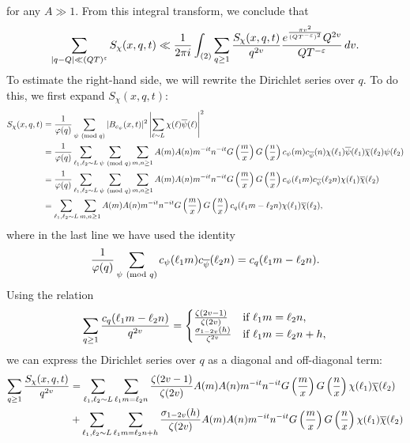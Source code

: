 \documentclass[12pt,reqno,oneside]{amsart}
\begin{document}
    for any $A \gg 1$. From this integral transform, we conclude that
    \[
      \sum_{|q-Q| \ll (QT)^{\varepsilon}}S_{\chi}(x,q,t) \ll \frac{1}{2\pi i}\int_{(2)}\sum_{q \ge 1}\frac{S_{\chi}(x,q,t)}{q^{2v}}\frac{e^{\frac{\pi v^{2}}{(QT^{-\varepsilon})^{2}}}Q^{2v}}{QT^{-\varepsilon}}\,dv.
    \]
    To estimate the right-hand side, we will rewrite the Dirichlet series over $q$. To do this, we first expand $S_{\chi}(x,q,t)$:
    \begin{align*}
      S_{\chi}(x,q,t) &= \frac{1}{\varphi(q)}\sum_{\psi \ \left(\text{mod }q\right)}|B_{c_{\psi}}(x,t)|^{2}\left|\sum_{\ell \sim L}\chi(\ell)\overline{\psi}(\ell)\right|^{2} \\
      &= \frac{1}{\varphi(q)}\sum_{\ell_{1},\ell_{2} \sim L}\sum_{\psi \ \left(\text{mod }q\right)}\sum_{m,n \ge 1}A(m)A(n)m^{-it}n^{-it}G\left(\frac{m}{x}\right)G\left(\frac{n}{x}\right)c_{\psi}(m)c_{\overline{\psi}}(n)\chi(\ell_{1})\overline{\psi}(\ell_{1})\overline{\chi}(\ell_{2})\psi(\ell_{2}) \\
      &= \frac{1}{\varphi(q)}\sum_{\ell_{1},\ell_{2} \sim L}\sum_{\psi \ \left(\text{mod }q\right)}\sum_{m,n \ge 1}A(m)A(n)m^{-it}n^{-it}G\left(\frac{m}{x}\right)G\left(\frac{n}{x}\right)c_{\psi}(\ell_{1}m)c_{\overline{\psi}}(\ell_{2}n)\chi(\ell_{1})\overline{\chi}(\ell_{2}) \\
      &= \sum_{\ell_{1},\ell_{2} \sim L}\sum_{m,n \ge 1}A(m)A(n)m^{-it}n^{-it}G\left(\frac{m}{x}\right)G\left(\frac{n}{x}\right)c_{q}(\ell_{1}m-\ell_{2}n)\chi(\ell_{1})\overline{\chi}(\ell_{2}),
    \end{align*}
    where in the last line we have used the identity
    \[
      \frac{1}{\varphi(q)}\sum_{\psi \ \left(\text{mod }q\right)}c_{\psi}(\ell_{1}m)c_{\overline{\psi}}(\ell_{2}n) = c_{q}(\ell_{1}m-\ell_{2}n).
    \]
    Using the relation
    \[
      \sum_{q \ge 1}\frac{c_{q}(\ell_{1}m-\ell_{2}n)}{q^{2v}} = \begin{cases} \frac{\zeta(2v-1)}{\zeta(2v)} & \text{if $\ell_{1}m = \ell_{2}n$}, \\ \frac{\sigma_{1-2v}(h)}{\zeta^{2v}} & \text{if $\ell_{1}m = \ell_{2}n+h$}, \end{cases}
    \]
    we can express the Dirichlet series over $q$ as a diagonal and off-diagonal term:
    \begin{align*}
      \sum_{q \ge 1}\frac{S_{\chi}(x,q,t)}{q^{2v}} &= \sum_{\ell_{1},\ell_{2} \sim L}\sum_{\ell_{1}m = \ell_{2}n}\frac{\zeta(2v-1)}{\zeta(2v)}A(m)A(n)m^{-it}n^{-it}G\left(\frac{m}{x}\right)G\left(\frac{n}{x}\right)\chi(\ell_{1})\overline{\chi}(\ell_{2}) \\
      &+\sum_{\ell_{1},\ell_{2} \sim L}\sum_{\ell_{1}m = \ell_{2}n+h}\frac{\sigma_{1-2v}(h)}{\zeta(2v)}A(m)A(n)m^{-it}n^{-it}G\left(\frac{m}{x}\right)G\left(\frac{n}{x}\right)\chi(\ell_{1})\overline{\chi}(\ell_{2})
    \end{align*}
\end{document}
